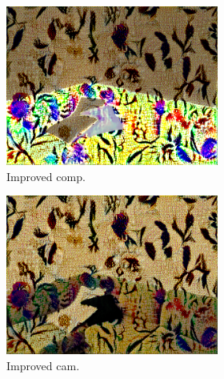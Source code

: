 \begin{figure}[]
\begin{subfigure}{\textwidth}
        \begin{subfigure}{0.24\textwidth}
            \centering
            \includegraphics[width=\textwidth]{images/04-experiment02/sofa/flowers2/improved_im.jpg}
            \caption*{Improved comp.}
        \end{subfigure}
        \hfill
        \begin{subfigure}{0.24\textwidth}
            \centering
            \includegraphics[width=\textwidth]{images/04-experiment02/sofa/flowers2/improved_proj.jpg}
            \caption*{Improved cam.}
        \end{subfigure}
        \hfill
        \begin{subfigure}{0.24\textwidth}
            \centering

\end{subfigure}
\end{subfigure}
\end{figure}
